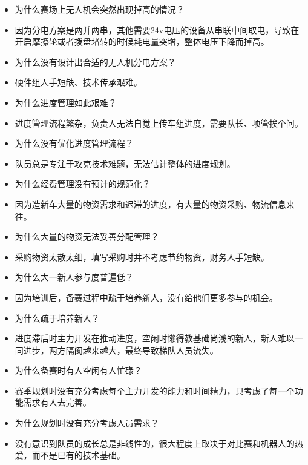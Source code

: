 \begin{itemize}
            \item 为什么赛场上无人机会突然出现掉高的情况？
            \item 因为分电方案是两并两串，其他需要24v电压的设备从串联中间取电，导致在开启摩擦轮或者拨盘堵转的时候耗电量突增，整体电压下降而掉高。
            \item 为什么没有设计出合适的无人机分电方案？
            \item 硬件组人手短缺、技术传承艰难。\\
            
            \item 为什么进度管理如此艰难？
            \item 进度管理流程繁杂，负责人无法自觉上传车组进度，需要队长、项管挨个问。
            \item 为什么没有优化进度管理流程？
            \item 队员总是专注于攻克技术难题，无法估计整体的进度规划。\\

            \item 为什么经费管理没有预计的规范化？
            \item 因为造新车大量的物资需求和迟滞的进度，有大量的物资采购、物流信息来往。
            \item 为什么大量的物资无法妥善分配管理？
            \item 采购物资太散太细，填写采购时并不考虑节约物资，财务人手短缺。\\

            \item 为什么大一新人参与度普遍低？
            \item 因为培训后，备赛过程中疏于培养新人，没有给他们更多参与的机会。
            \item 为什么疏于培养新人？
            \item 进度滞后时主力开发在推动进度，空闲时懒得教基础尚浅的新人，新人难以一同进步，两方隔阂越来越大，最终导致梯队人员流失。\\

            \item 为什么备赛时有人空闲有人忙碌？
            \item 赛季规划时没有充分考虑每个主力开发的能力和时间精力，只考虑了每一个功能需求有人去完善。
            \item 为什么规划时没有充分考虑人员需求？
            \item 没有意识到队员的成长总是非线性的，很大程度上取决于对比赛和机器人的热爱，而不是已有的技术基础。\\


\end{itemize}

